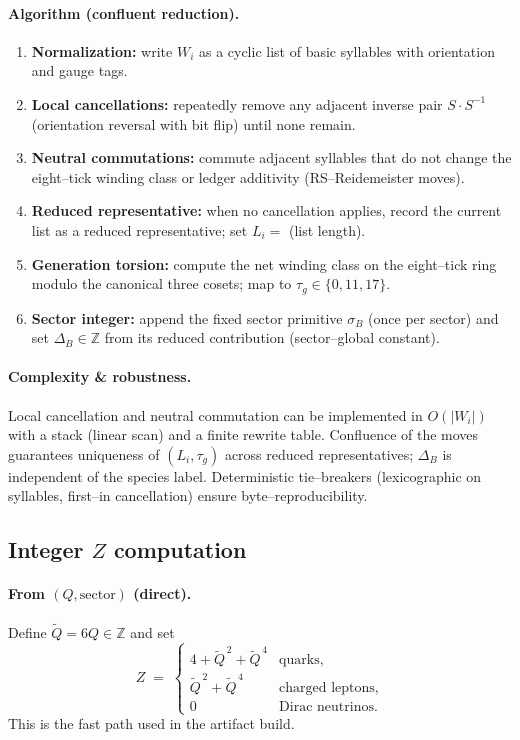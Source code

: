 \documentclass[epjc3]{svjour3}
\begin{document}
\paragraph{Algorithm (confluent reduction).}
\begin{enumerate}
  \item \textbf{Normalization:} write $W_i$ as a cyclic list of basic syllables with orientation and gauge tags.
  \item \textbf{Local cancellations:} repeatedly remove any adjacent inverse pair $S\cdot S^{-1}$ (orientation reversal with bit flip) until none remain.
  \item \textbf{Neutral commutations:} commute adjacent syllables that do not change the eight--tick winding class or ledger additivity (RS--Reidemeister moves).
  \item \textbf{Reduced representative:} when no cancellation applies, record the current list as a reduced representative; set $L_i=$ (list length).
  \item \textbf{Generation torsion:} compute the net winding class on the eight--tick ring modulo the canonical three cosets; map to $\tau_g\in\{0,11,17\}$.
  \item \textbf{Sector integer:} append the fixed sector primitive $\sigma_B$ (once per sector) and set $\Delta_B\in\mathbb{Z}$ from its reduced contribution (sector--global constant).
\end{enumerate}

\paragraph{Complexity \& robustness.}
Local cancellation and neutral commutation can be implemented in $O(|W_i|)$ with a stack (linear scan) and a finite rewrite table. Confluence of the moves guarantees uniqueness of $(L_i,\tau_g)$ across reduced representatives; $\Delta_B$ is independent of the species label. Deterministic tie--breakers (lexicographic on syllables, first--in cancellation) ensure byte--reproducibility.

\subsection{Integer $Z$ computation}
\paragraph{From $(Q,\text{sector})$ (direct).}
Define $\tilde Q=6Q\in\mathbb{Z}$ and set
\[
  Z \;=\;
  \begin{cases}
    4+\tilde Q^{\,2}+\tilde Q^{\,4} & \text{quarks},\\[2pt]
    \tilde Q^{\,2}+\tilde Q^{\,4}   & \text{charged leptons},\\[2pt]
    0                               & \text{Dirac neutrinos}.
  \end{cases}
\]
This is the fast path used in the artifact build.
\end{document}
